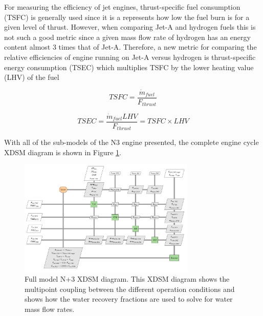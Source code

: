 \documentclass[conf]{new-aiaa}
\begin{document}
For measuring the efficiency of jet engines, thrust-specific fuel consumption (TSFC) is generally used since it is a represents how low the fuel burn is for a given level of thrust.
However, when comparing Jet-A and hydrogen fuels this is not such a good metric since a given mass flow rate of hydrogen has an energy content almost 3 times that of Jet-A.
Therefore, a new metric for comparing the relative efficiencies of engine running on Jet-A versus hydrogen is thrust-specific energy consumption (TSEC) which multiplies TSFC by the lower heating value (LHV) of the fuel %

\begin{equation}
    TSFC = \frac{\Dot{m}_{fuel}}{F_{thrust}}
\end{equation}

\begin{equation}
    TSEC = \frac{\Dot{m}_{fuel} LHV}{F_{thrust}} = TSFC \times LHV
\end{equation}

With all of the sub-models of the N3 engine presented, the complete engine cycle XDSM diagram is shown in Figure \ref{fig:N3_xdsm_full}.

\begin{figure}[hbt!]
    \centering
    \includegraphics[width=0.75\textwidth]{N3_xdsm_full.pdf}
    \caption{
        Full model N+3 XDSM diagram.
        This XDSM diagram shows the multipoint coupling between the different operation conditions and shows how the water recovery fractions are used to solve for water mass flow rates.
    }
    \label{fig:N3_xdsm_full}
\end{figure}
\end{document}

